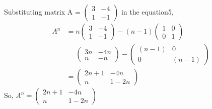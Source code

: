 \documentclass[journal,12pt,twocolumn]{IEEEtran}
\newcommand{\myvec}[1]{\ensuremath{\begin{pmatrix}#1\end{pmatrix}}}
\begin{document}
Substituting matrix A = \myvec{ 3 & -4 \\ 1 & -1 } in the equation5,
\begin {align}
	A^n &= n\myvec{ 3 & -4 \\ 1 & -1 } - (n-1)\myvec{ 1 & 0 \\ 0 & 1 } \\
	    &=\myvec{ 3n & -4n \\ n & -n } - \myvec{ (n-1) & 0 \\ 0 & (n-1)} \\
	    &=\myvec{ 2n+1 & -4n \\ n & 1-2n }  
\end{align}
So, $A^n =\myvec{ 2n+1 & -4n \\ n & 1-2n }$  
\end{document}
